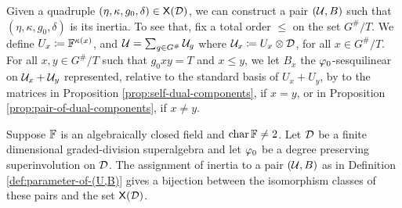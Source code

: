 Given a quadruple $(\eta, \kappa, g_0, \delta) \in \mathsf{X} (\mathcal{D})$, we can construct a pair $(\mathcal U, B)$ such that $(\eta, \kappa, g_0, \delta)$ is its inertia. 
To see that, fix a total order $\leq$ on the set $G^\#/T$.
We define $U_x \coloneqq \mathbb{F}^{\kappa(x)}$, and $\mathcal U = \sum_{g \in G^\#} \mathcal U_g$ where $\mathcal U_x \coloneqq U_x \otimes \mathcal{D}$, for all $x\in G^\#/T$. 
For all $x, y \in G^\#/T$ such that $g_0x y = T$ and $x \leq y$, we let $B_x$ the $\varphi_0$-sesquilinear on $\mathcal U_x + \mathcal U_y$ represented, relative to the standard basis of $U_x+U_y$, by to the matrices in Proposition \ref{prop:self-dual-components}, if $x=y$, or in Proposition \ref{prop:pair-of-dual-components}, if $x\neq y$. 

\begin{thm}\label{thm:iso-(U,B)}
    Suppose $\mathbb{F}$ is an algebraically closed field and $\operatorname{char} \mathbb{F} \neq 2$. 
    Let $\mathcal{D}$ be a finite dimensional graded-division superalgebra and let $\varphi_0$ be a degree preserving superinvolution on $\mathcal{D}$. 
    The assignment of inertia to a pair $(\mathcal U, B)$ as in Definition \ref{def:parameter-of-(U,B)} gives a bijection between the isomorphism classes of these pairs and the set $\mathsf{X} (\mathcal{D})$.
\end{thm}

